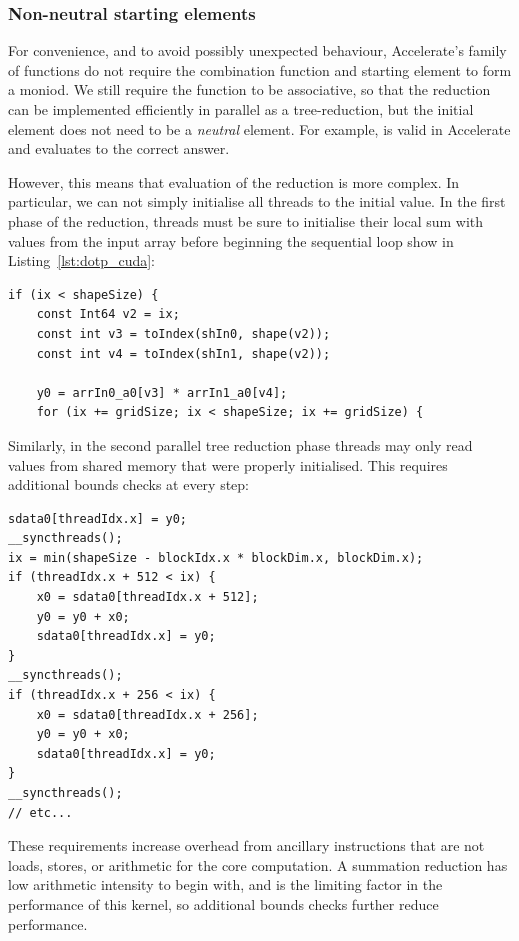 \subsubsection{Non-neutral starting elements}

For convenience, and to avoid possibly unexpected behaviour, Accelerate's
 family of functions do not require the combination function and
starting element to form a moniod. We still require the function to be
associative, so that the reduction can be implemented efficiently in parallel as
a tree-reduction, but the initial element does not need to be a \emph{neutral}
element. For example,  is valid in
Accelerate and evaluates to the correct answer.

However, this means that evaluation of the reduction is more complex. In
particular, we can not simply initialise all threads to the initial value.
In the first phase of the reduction, threads must be sure to initialise
their local sum  with values from the input array before beginning the
sequential loop show in Listing~\ref{lst:dotp_cuda}:
%
\begin{lstlisting}[style=cuda,firstnumber=12]
if (ix < shapeSize) {
    const Int64 v2 = ix;
    const int v3 = toIndex(shIn0, shape(v2));
    const int v4 = toIndex(shIn1, shape(v2));

    y0 = arrIn0_a0[v3] * arrIn1_a0[v4];
    for (ix += gridSize; ix < shapeSize; ix += gridSize) {
\end{lstlisting}

Similarly, in the second parallel tree reduction phase threads may only read
values from shared memory that were properly initialised. This requires
additional bounds checks at every step:
%
\begin{lstlisting}[style=cuda,firstnumber=27]
sdata0[threadIdx.x] = y0;
__syncthreads();
ix = min(shapeSize - blockIdx.x * blockDim.x, blockDim.x);
if (threadIdx.x + 512 < ix) {
    x0 = sdata0[threadIdx.x + 512];
    y0 = y0 + x0;
    sdata0[threadIdx.x] = y0;
}
__syncthreads();
if (threadIdx.x + 256 < ix) {
    x0 = sdata0[threadIdx.x + 256];
    y0 = y0 + x0;
    sdata0[threadIdx.x] = y0;
}
__syncthreads();
// etc...
\end{lstlisting}

These requirements increase overhead from ancillary instructions that are not
loads, stores, or arithmetic for the core computation. A summation reduction has
low arithmetic intensity to begin with, and is the limiting factor in the
performance of this kernel, so additional bounds checks further reduce
performance.

